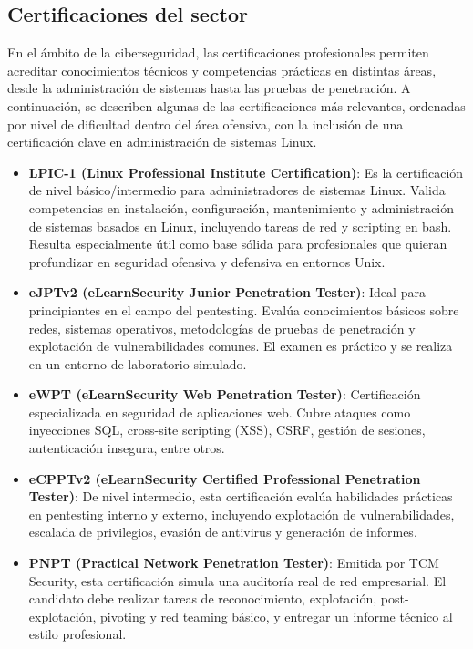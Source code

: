 \documentclass[a4paper, 10pt]{article}
\begin{document}
        \subsection{Certificaciones del sector}

        En el ámbito de la ciberseguridad, las certificaciones profesionales permiten acreditar conocimientos técnicos y competencias prácticas en distintas áreas, desde la administración de sistemas hasta las pruebas de penetración. A continuación, se describen algunas de las certificaciones más relevantes, ordenadas por nivel de dificultad dentro del área ofensiva, con la inclusión de una certificación clave en administración de sistemas Linux.
        
        \begin{itemize}
            \item \textbf{LPIC-1 (Linux Professional Institute Certification)}: Es la certificación de nivel básico/intermedio para administradores de sistemas Linux. Valida competencias en instalación, configuración, mantenimiento y administración de sistemas basados en Linux, incluyendo tareas de red y scripting en bash. Resulta especialmente útil como base sólida para profesionales que quieran profundizar en seguridad ofensiva y defensiva en entornos Unix.
        
            \item \textbf{eJPTv2 (eLearnSecurity Junior Penetration Tester)}: Ideal para principiantes en el campo del pentesting. Evalúa conocimientos básicos sobre redes, sistemas operativos, metodologías de pruebas de penetración y explotación de vulnerabilidades comunes. El examen es práctico y se realiza en un entorno de laboratorio simulado.
        
            \item \textbf{eWPT (eLearnSecurity Web Penetration Tester)}: Certificación especializada en seguridad de aplicaciones web. Cubre ataques como inyecciones SQL, cross-site scripting (XSS), CSRF, gestión de sesiones, autenticación insegura, entre otros.
        
            \item \textbf{eCPPTv2 (eLearnSecurity Certified Professional Penetration Tester)}: De nivel intermedio, esta certificación evalúa habilidades prácticas en pentesting interno y externo, incluyendo explotación de vulnerabilidades, escalada de privilegios, evasión de antivirus y generación de informes.
        
            \item \textbf{PNPT (Practical Network Penetration Tester)}: Emitida por TCM Security, esta certificación simula una auditoría real de red empresarial. El candidato debe realizar tareas de reconocimiento, explotación, post-explotación, pivoting y red teaming básico, y entregar un informe técnico al estilo profesional.
        

\end{itemize}
\end{document}

